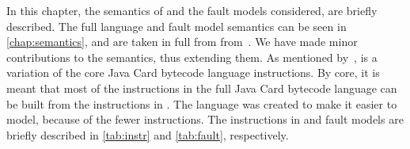 \label{chap:semantics}
%
%
%
In this chapter, the semantics of \jcl and the fault models considered, are briefly described. The full language and fault model semantics can be seen in \cref{chap:semantics}, and are taken in full from from~\cite{javasec}. We have made minor contributions to the semantics, thus extending them. As mentioned by~\cite{javasec}, \jcl is a variation of the core Java Card bytecode language instructions. By core, it is meant that most of the instructions in the full  Java Card bytecode language can be built from the instructions in \jcl. The language was created to make it easier to model, because of the fewer instructions. The instructions in \jcl and fault models are briefly described in \cref{tab:instr} and \cref{tab:fault}, respectively. 


%

